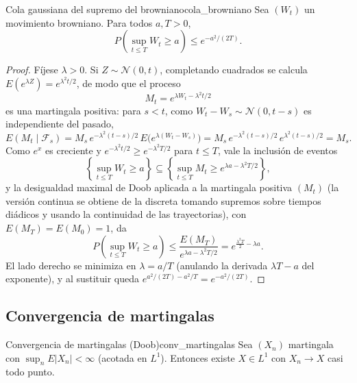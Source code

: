 \documentclass[11pt, a4paper]{article}
\begin{document}
\begin{corolario}{Cola gaussiana del supremo del browniano}{cola_browniano}
Sea $(W_t)$ un movimiento browniano. Para todos $a, T > 0$,
$$ P\!\left(\sup_{t \le T} W_t \ge a\right) \le e^{-a^2/(2T)}. $$
\end{corolario}

\begin{proof}
Fíjese $\lambda > 0$. Si $Z \sim \mathcal{N}(0, t)$, completando cuadrados se calcula
$E(e^{\lambda Z}) = e^{\lambda^2 t/2}$, de modo que el proceso
$$ M_t = e^{\lambda W_t - \lambda^2 t / 2} $$
es una martingala positiva: para $s < t$, como $W_t - W_s \sim \mathcal{N}(0, t - s)$ es
independiente del pasado,
$$ E(M_t \mid \mathcal{F}_s) = M_s \, e^{-\lambda^2 (t - s)/2} \, E\big(e^{\lambda (W_t -
W_s)}\big) = M_s \, e^{-\lambda^2 (t-s)/2} \, e^{\lambda^2 (t-s)/2} = M_s. $$
Como $e^x$ es creciente y $e^{-\lambda^2 t/2} \ge e^{-\lambda^2 T/2}$ para $t \le T$, vale la
inclusión de eventos
$$ \left\{ \sup_{t \le T} W_t \ge a \right\} \subseteq \left\{ \sup_{t \le T} M_t \ge
e^{\lambda a - \lambda^2 T/2} \right\}, $$
y la desigualdad maximal de Doob aplicada a la martingala positiva $(M_t)$ (la versión
continua se obtiene de la discreta tomando supremos sobre tiempos diádicos y usando la
continuidad de las trayectorias), con $E(M_T) = E(M_0) = 1$, da
$$ P\!\left(\sup_{t \le T} W_t \ge a\right) \le \frac{E(M_T)}{e^{\lambda a - \lambda^2 T/2}} =
e^{\frac{\lambda^2 T}{2} - \lambda a}. $$
El lado derecho se minimiza en $\lambda = a/T$ (anulando la derivada $\lambda T - a$ del
exponente), y al sustituir queda $e^{a^2/(2T) - a^2/T} = e^{-a^2/(2T)}$.
\end{proof}

\subsection{Convergencia de martingalas}

\begin{teorema}{Convergencia de martingalas (Doob)}{conv_martingalas}
Sea $(X_n)$ martingala con $\sup_n E|X_n| < \infty$ (acotada en $L^1$). Entonces existe
$X \in L^1$ con $X_n \to X$ casi todo punto.
\end{teorema}
\end{document}
